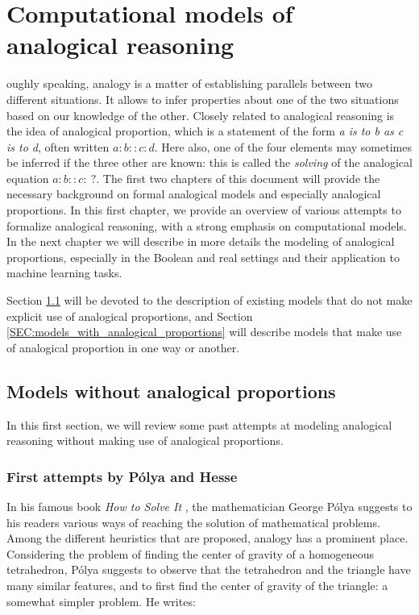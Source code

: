 \chapter{Computational models of analogical reasoning}
\label{CHAP:computational_models_of_analogical_reasoning}
\renewcommand{\contentsname}{Content}
\localtableofcontents*
\vspace*{\baselineskip}

oughly speaking, analogy is a matter of establishing parallels
between two different situations. It allows to infer properties about one of
the two situations based on our knowledge of the other. Closely related to
analogical reasoning is the idea of analogical proportion, which is a statement
of the form \textit{a is to b as c is to d}, often written $a:b::c:d$. Here
also, one of the four elements may sometimes be inferred if the three other are
known: this is called the \textit{solving} of the analogical equation
$a:b::c:~?$. The first two chapters of this document will provide
the necessary background on formal analogical models and especially analogical
proportions. In this first chapter, we provide an overview of various attempts
to formalize analogical reasoning, with a strong emphasis on computational
models. In the next chapter we will describe in more details the modeling of
analogical proportions, especially in the Boolean and real settings and their
application to machine learning tasks.

Section \ref{SEC:models_without_proportions} will be devoted to the description
of existing models that do not make explicit use of analogical proportions, and
Section \ref{SEC:models_with_analogical_proportions} will describe models that
make use of analogical proportion in one way or another.

\section{Models without analogical proportions}
\label{SEC:models_without_proportions}

In this first section, we will review some past attempts at modeling analogical
reasoning without making use of analogical proportions.

\subsection{First attempts by P\'olya and Hesse}

In his famous book \textit{How to Solve It} \cite{Pol45}, the mathematician
George P\'olya suggests to his readers various ways of reaching the solution
of mathematical problems. Among the different heuristics that are
proposed, analogy has a prominent place. Considering the problem of finding
the center of gravity of a homogeneous tetrahedron, P\'olya suggests to observe
that the tetrahedron and the triangle have many similar features, and to first
find the center of gravity of the triangle: a somewhat simpler problem. He
writes:

